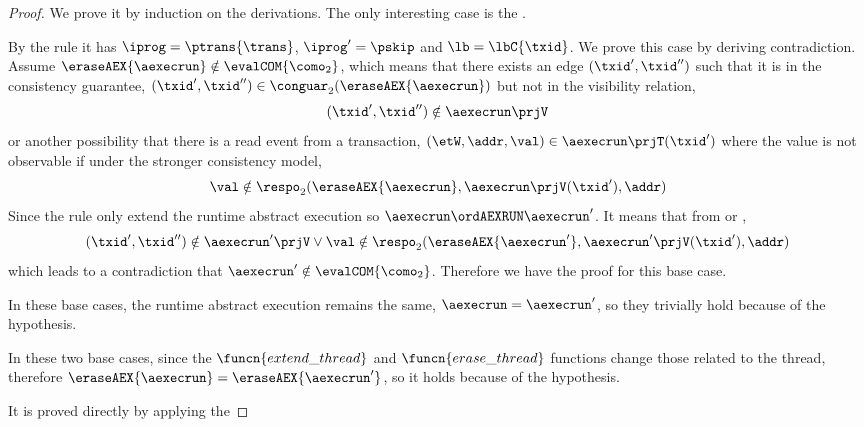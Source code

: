 \begin{proof}
We prove it by induction on the derivations.
The only interesting case is the .


By the rule it has \( \iprog = \ptrans{\trans} \), \( \iprog' = \pskip \) and \( \lb = \lbC{\txid} \).
We prove this case by deriving contradiction.
Assume \( \eraseAEX{\aexecrun} \notin \evalCOM{\como_{2}} \), which means that there exists an edge \( (\txid', \txid'') \) such that it is in the consistency guarantee, \( (\txid', \txid'') \in \conguar_{2}(\eraseAEX{\aexecrun}) \) but not in the visibility relation,
\begin{equation}
    \label{equ:not-in-vis}
    (\txid', \txid'') \notin \aexecrun\prjV 
\end{equation}
or another possibility that there is a read event from a transaction, \( (\etW, \addr, \val) \in \aexecrun\prjT(\txid') \) where the value is not observable if under the stronger consistency model, \ie
\begin{equation}
    \label{equ:not-observable}
    \val \notin \respo_{2}(\eraseAEX{\aexecrun}, \aexecrun\prjV(\txid'), \addr) 
\end{equation}
Since the rule only extend the runtime abstract execution so \( \aexecrun \ordAEXRUN \aexecrun'\). 
It means that from  or , 
\[
    (\txid', \txid'') \notin \aexecrun'\prjV \lor \val \notin \respo_{2}(\eraseAEX{\aexecrun'}, \aexecrun'\prjV(\txid'), \addr) 
\]
which leads to a contradiction that \( \aexecrun' \notin \evalCOM{\como_{2}} \).
Therefore we have the proof for this base case.


In these base cases, the runtime abstract execution remains the same, \ie \( \aexecrun = \aexecrun' \), so they trivially hold because of the hypothesis.


In these two base cases, since the \( \funcn{extend\_thread} \)  and \( \funcn{erase\_thread} \) functions change those related to the thread, therefore \ie \( \eraseAEX{\aexecrun} = \eraseAEX{\aexecrun'} \), so it holds because of the hypothesis.


It is proved directly by applying the \ih
\end{proof}

